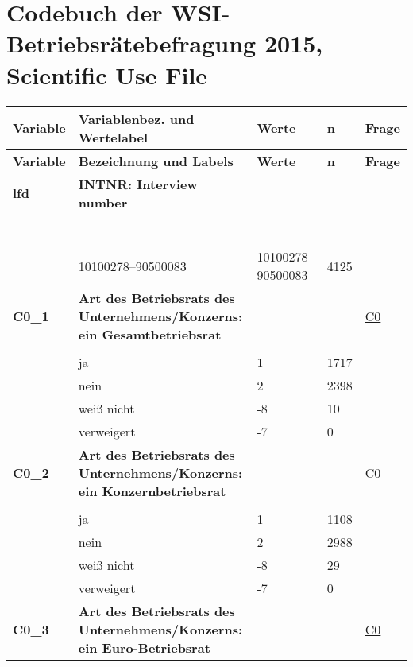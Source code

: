 \section{Codebuch der WSI-Betriebsrätebefragung 2015, Scientific Use File}
\begin{longtable}{| L{2.5cm} | L{8.25cm}| C{1.5cm} | R{1.25cm} | C{2.25cm} |  }
\toprule
\textbf{Variable} & \textbf{Variablenbez. und Wertelabel}& \textbf{Werte} &  \textbf{n} & \textbf{Frage} \\
\midrule
\endfirsthead
\toprule
\textbf{Variable} & \textbf{Bezeichnung und Labels}& \textbf{Werte} & \textbf{n} & \textbf{Frage} \\
\midrule
\endhead
\midrule
\endfoot
\bottomrule
\endlastfoot
 \textbf{lfd}\label{var:suf:lfd} & \textbf{INTNR: Interview number} &  &  &  \\ 
   & \protect\subsection[Variablen lfd bis C1\_1\_gen]{} &  &  &  \\ 
   & 10100278--90500083 & 10100278--90500083 & 4125 &  \\ 
   \midrule
\textbf{C0\_1}\label{var:suf:C0:1} & \textbf{Art des Betriebsrats des Unternehmens/Konzerns: ein Gesamtbetriebsrat} &  &  & \hyperref[C0]{C0} \\ 
   &  &  &  &  \\ 
   & ja & 1 & 1717 &  \\ 
   & nein & 2 & 2398 &  \\ 
   & weiß nicht & -8 & 10 &  \\ 
   & verweigert & -7 & 0 &  \\ 
   \midrule
\textbf{C0\_2}\label{var:suf:C0:2} & \textbf{Art des Betriebsrats des Unternehmens/Konzerns: ein Konzernbetriebsrat} &  &  & \hyperref[C0]{C0} \\ 
   &  &  &  &  \\ 
   & ja & 1 & 1108 &  \\ 
   & nein & 2 & 2988 &  \\ 
   & weiß nicht & -8 & 29 &  \\ 
   & verweigert & -7 & 0 &  \\ 
   \midrule
\textbf{C0\_3}\label{var:suf:C0:3} & \textbf{Art des Betriebsrats des Unternehmens/Konzerns: ein Euro-Betriebsrat} &  &  & \hyperref[C0]{C0} \\ 

\end{longtable}
